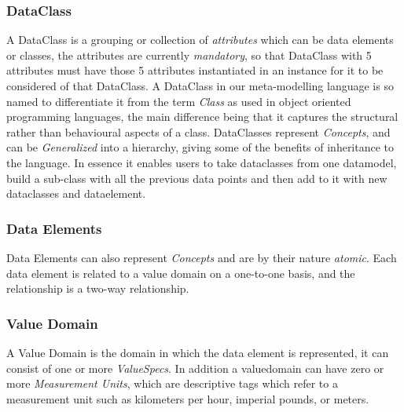 \subsubsection{DataClass}

A DataClass is a grouping or collection of \emph{attributes} which can
be data elements or classes, the attributes are currently
\emph{mandatory}, so that DataClass with 5 attributes must have those
5 attributes instantiated in an instance for it to be considered of
that DataClass. A DataClass in our meta-modelling language is so named
to differentiate it from the term \emph{Class} as used in object
oriented programming languages, the main difference being that it
captures the structural rather than behavioural aspects of a class.
DataClasses represent \emph{Concepts}, and can be \emph{Generalized}
into a hierarchy, giving some of the benefits of inheritance to the
language. In essence it enables users to take dataclasses from one
datamodel, build a sub-class with all the previous data points and
then add to it with new dataclasses and dataelement.
\subsubsection{Data Elements} 
Data Elements can also represent \emph{Concepts} and are by their nature \emph{atomic}.  Each data element is related to a value domain on a one-to-one basis, and the relationship is a two-way relationship.
\subsubsection{Value Domain}
A Value Domain is the domain in which the data element is represented, it can consist of one or more \emph{ValueSpecs}. In addition a valuedomain can have zero or more \emph{Measurement Units}, which are descriptive tags which refer to a measurement unit such as kilometers per hour, imperial pounds, or meters. 
